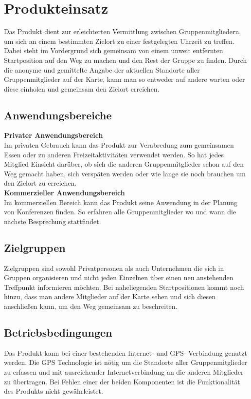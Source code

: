 
\section{Produkteinsatz}
Das Produkt dient zur erleichterten Vermittlung zwischen Gruppenmitgliedern, um sich an einem bestimmten Zielort zu einer festgelegten Uhrzeit zu treffen. Dabei steht im Vordergrund sich gemeinsam von einem unweit entfernten Startposition auf den Weg zu machen und den Rest der Gruppe zu finden. Durch die anonyme und gemittelte Angabe der aktuellen Standorte aller Gruppenmitglieder auf der Karte, kann man so entweder auf andere warten oder diese einholen und gemeinsam den Zielort erreichen.\\

\subsection{Anwendungsbereiche}
\textbf{Privater Anwendungsbereich} \\
Im privaten Gebrauch kann das Produkt zur Verabredung zum gemeinsamen Essen oder zu anderen Freizeitaktivitäten verwendet werden. So hat jedes Mitglied Einsicht darüber, ob sich die anderen Gruppenmitglieder schon auf den Weg gemacht haben, sich verspäten werden oder wie lange sie noch brauchen um den Zielort zu erreichen.\\

\textbf{Kommerzieller Anwendungsbereich} \\
Im kommerziellen Bereich kann das Produkt seine Anwendung in der Planung von Konferenzen finden. So erfahren alle Gruppenmitglieder wo und wann die nächste Besprechung stattfindet. \\

\subsection{Zielgruppen}
Zielgruppen sind sowohl Privatpersonen als auch Unternehmen die sich in Gruppen organisieren und nicht jeden Einzelnen über einen neu anstehenden Treffpunkt informieren möchten. Bei naheliegenden Startpositionen kommt noch hinzu, dass man andere Mitglieder auf der Karte sehen und sich diesen anschließen kann, um den Weg gemeinsam zu beschreiten.


\subsection{Betriebsbedingungen}
Das Produkt kann bei einer bestehenden Internet- und GPS- Verbindung genutzt werden. Die GPS Technologie ist nötig um die Standorte aller Gruppenmitglieder zu erfassen und mit ausreichender Internetverbindung an die anderen Mitglieder zu übertragen. Bei Fehlen einer der beiden Komponenten ist die Funktionalität des Produkts nicht gewährleistet.\\


